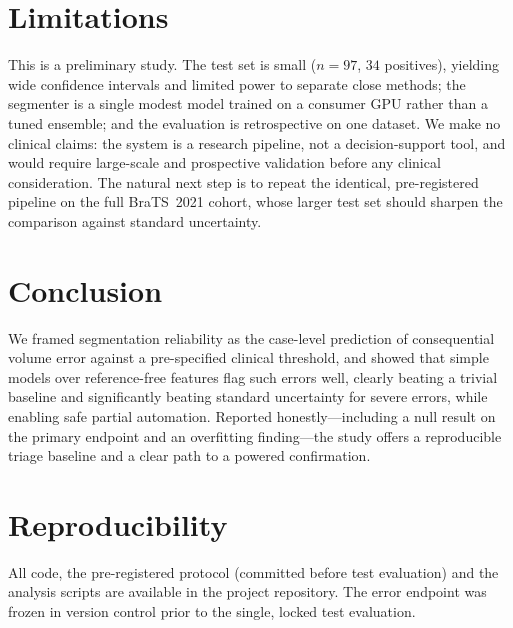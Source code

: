 \documentclass[11pt]{article}
\begin{document}
\section{Limitations}
This is a preliminary study. The test set is small ($n{=}97$, $34$ positives), yielding
wide confidence intervals and limited power to separate close methods; the segmenter is
a single modest model trained on a consumer GPU rather than a tuned ensemble; and the
evaluation is retrospective on one dataset. We make no clinical claims: the system is a
research pipeline, not a decision-support tool, and would require large-scale and
prospective validation before any clinical consideration. The natural next step is to
repeat the identical, pre-registered pipeline on the full BraTS~2021 cohort, whose larger
test set should sharpen the comparison against standard uncertainty.

\section{Conclusion}
We framed segmentation reliability as the case-level prediction of consequential volume
error against a pre-specified clinical threshold, and showed that simple models over
reference-free features flag such errors well, clearly beating a trivial baseline and
significantly beating standard uncertainty for severe errors, while enabling safe
partial automation. Reported honestly---including a null result on the primary endpoint
and an overfitting finding---the study offers a reproducible triage baseline and a clear
path to a powered confirmation.

\section*{Reproducibility}
All code, the pre-registered protocol (committed before test evaluation) and the analysis
scripts are available in the project repository. The error endpoint was frozen in version
control prior to the single, locked test evaluation.
\end{document}

